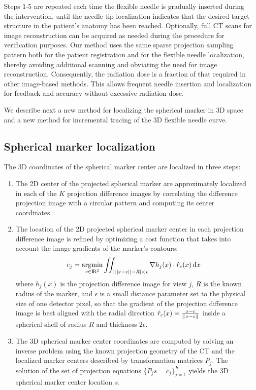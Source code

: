 Steps 1-5 are repeated each time the flexible needle is gradually inserted during the intervention, until the needle tip localization indicates that the desired target structure in the patient's anatomy has been reached. Optionally, full CT scans for image reconstruction can be acquired as needed during the procedure for verification purposes. Our method uses the same sparse projection sampling pattern both for the patient registration and for the flexible needle localization, thereby avoiding additional scanning and obviating the need for image reconstruction. Consequently, the radiation dose is a fraction of that required in other image-based methods. This allows frequent needle insertion and localization for feedback and accuracy without excessive radiation dose.

We describe next a new method for localizing the spherical marker in 3D space and a new method for incremental tracing of the 3D flexible needle curve.

\subsection*{\textbf{Spherical marker localization}} \label{markerloc}
The 3D coordinates of the spherical marker center are localized in three steps:
\begin{enumerate}
    \item 
    {
    The 2D center of the projected spherical marker are approximately localized in each of the $K$ projection difference images by correlating the difference projection image with a circular pattern and computing its center coordinates. \\[0.01ex]
    }
    \item 
    {
    The location of the 2D projected spherical marker center in each projection difference image is refined by optimizing a cost function that takes into account the image gradients of the marker's contours:
    \begin{equation}
        c_j = \operatorname*{argmin}_{c \in \rm I\!R^2}{
        \iint_{\lvert \, \lvert\lvert x-c \rvert\rvert - R \rvert < \epsilon}
        {\nabla h_j(x) \cdot \hat{r}_c (x)} \, \mathrm{d}x}
    \end{equation}
    where $h_j(x)$ is the projection difference image for view $j$, $R$ is the known radius of the marker, and $\epsilon$ is a small distance parameter set to the physical size of one detector pixel, so that the gradient of the projection difference image is best aligned with the radial direction $\hat{r}_c (x) = \frac{x-c}{ \\\lvert\lvert x-c \rvert\rvert}$ inside a spherical shell of radius $R$ and thickness $2\epsilon$. \\[0.01ex]
    }
    \item {
    The 3D spherical marker center coordinates are computed by solving an inverse problem using the known projection geometry of the CT and the localized marker centers described by transformation matrices $P_j$. The solution of the set of projection equations $\{P_j s = c_j\}_{j=1}^K$  yields the 3D spherical marker center location $s$.}
\end{enumerate}
